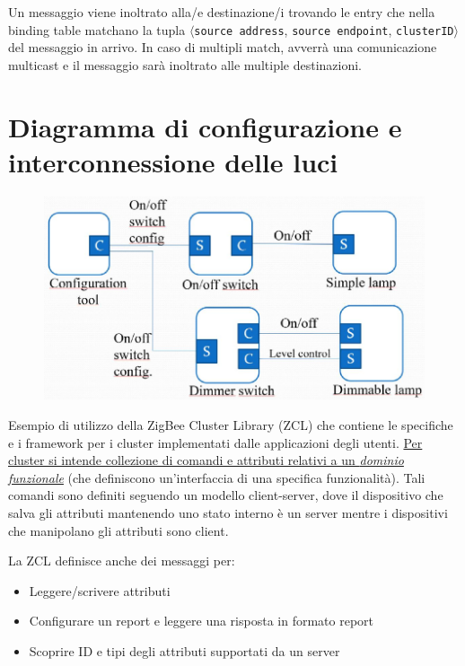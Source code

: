 Un messaggio viene inoltrato alla/e destinazione/i trovando le entry che nella binding table matchano la tupla $\langle$\texttt{source address}, \texttt{source endpoint}, \texttt{clusterID}$\rangle$ del messaggio in arrivo. 
In caso di multipli match, avverrà una comunicazione multicast e il messaggio sarà inoltrato alle multiple destinazioni.

\section{Diagramma di configurazione e interconnessione delle luci}

\begin{figure}[htbp]
   \centering
   \includegraphics{images/questions/Schermata del 2023-10-19 15-41-05.png}
   \label{fig:dom11}
\end{figure}

Esempio di utilizzo della ZigBee Cluster Library (ZCL) che contiene le specifiche e i framework per i cluster implementati dalle applicazioni degli utenti. \ul{Per cluster si intende collezione di comandi e attributi relativi a un \textit{dominio funzionale}} (che definiscono un'interfaccia di una specifica funzionalità).
Tali comandi sono definiti seguendo un modello client-server, dove il dispositivo che salva gli attributi mantenendo uno stato interno è un server mentre i dispositivi che manipolano gli attributi sono client.\\
{\ns La ZCL definisce anche dei messaggi per:
\begin{itemize}
   \item Leggere/scrivere attributi
   \item Configurare un report e leggere una risposta in formato report
   \item Scoprire ID e tipi degli attributi supportati da un server 
\end{itemize}}

